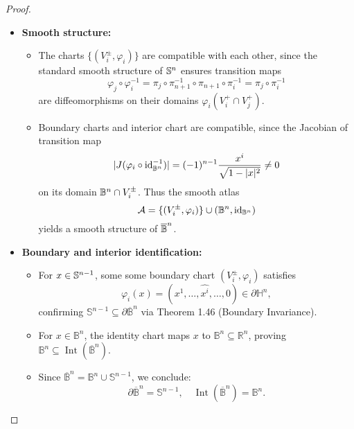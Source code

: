 \begin{problem}
\begin{proof}
\begin{itemize}
      \item \textbf{Smooth structure:} 
        \begin{itemize}
          \item The charts $\{(V_i^{\pm}, \varphi_i)\}$ are compatible with each other, since the standard smooth structure of $\mathbb{S}^n$ ensures transition maps
            \begin{equation*}
              \varphi_j \circ \varphi_i^{-1} = \pi_j \circ \pi_{n+1}^{-1} \circ \pi_{n+1} \circ \pi_i^{-1} = \pi_j \circ \pi_i^{-1}
            \end{equation*}
            are diffeomorphisms on their domains $\varphi_i(V_i^+ \cap V_j^+)$.
          \item Boundary charts and interior chart are compatible, since the Jacobian of transition map
            \begin{equation*}
              |J(\varphi_i \circ \text{id}^{-1}_{\mathbb{B}^n})| = (-1)^{n-1}\dfrac{x^i}{\sqrt{1-|x|^2}} \neq 0
            \end{equation*}
            on its domain $\mathbb{B}^n \cap V_i^{\pm}$. Thus the smooth atlas
            \begin{equation*}
              \mathcal{A} = \{(V_i^{\pm}, \varphi_i)\} \cup (\mathbb{B}^n, \text{id}_{\mathbb{B}^n})
            \end{equation*}
            yields a smooth structure of $\overline{\mathbb{B}}^n$.
          \end{itemize}
      \item \textbf{Boundary and interior identification:} 
        \begin{itemize}
          \item For $x \in \mathbb{S}^{n-1}$, some some boundary chart $(V_i^{\pm}, \varphi_i)$ satisfies 
            \begin{equation*}
              \varphi_i(x) = (x^1, \dots, \widehat{x^i}, \dots, 0) \in \partial \mathbb{H}^n,
            \end{equation*}
            confirming $\mathbb{S}^{n-1} \subseteq \partial \overline{\mathbb{B}}^n$ via Theorem 1.46 (Boundary Invariance).
          \item For $x \in \mathbb{B}^n$, the identity chart maps $x$ to $\mathbb{B}^n \subseteq \mathbb{R}^n$, proving $\mathbb{B}^n \subseteq \operatorname{Int}(\overline{\mathbb{B}}^n)$.
          \item Since $\overline{\mathbb{B}}^n = \mathbb{B}^n \cup \mathbb{S}^{n-1}$, we conclude:
            \begin{equation*}
              \partial \overline{\mathbb{B}}^n = \mathbb{S}^{n-1}, \quad \operatorname{Int}(\overline{\mathbb{B}}^n) = \mathbb{B}^n.
            \end{equation*}
      \end{itemize} 
    \end{itemize}
  \end{proof}
\end{problem}

